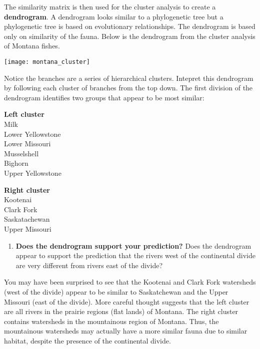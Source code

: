 \documentclass[11pt]{article}
\begin{document}
The similarity matrix is then used for the cluster analysis to create a \textbf{dendrogram}.
A dendrogram looks similar to a phylogenetic tree but a phylogenetic tree is
based on evolutionary relationships. The dendrogram is based only on similarity
of the fauna. Below is the dendrogram from the cluster analysis of Montana fishes.

	\texttt{[image: montana\_cluster]}

Notice the branches are a series of hierarchical clusters. Intepret this dendrogram
by following each cluster of branches from the top down. The first division of the dendrogram 
identifies two groups that appear to be most similar:

\begin{multicols}{2}
\textbf{Left cluster}\\
Milk\\
Lower Yellowstone\\
Lower Missouri\\
Musselshell\\
Bighorn\\
Upper Yellowstone
\columnbreak

\textbf{Right cluster}\\
Kootenai\\
Clark Fork\\
Saskatachewan\\
Upper Missouri
\end{multicols}

\newpage

\begin{enumerate}[resume,leftmargin=*]
\item \textbf{Does the dendrogram support your prediction?} Does the dendrogram appear
to support the prediction that the rivers west of the continental divide are very different
from rivers east of the divide?\vspace{10\baselineskip}
\end{enumerate}


You may have been surprised to see that the Kootenai and Clark Fork watersheds 
(west of the divide) appear to be similar to Saskatchewan and the Upper Missouri 
(east of the divide). More careful thought suggests that the left cluster are all rivers in
the prairie regions (flat lands) of Montana. The right cluster contains watersheds in
the mountainous region of Montana. Thus, the mountainous watersheds may actually
have a more similar fauna due to similar habitat, despite the presence of the continental
divide.
\end{document}
